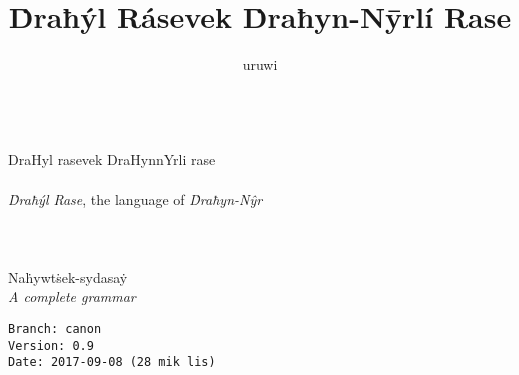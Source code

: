 \documentclass{book}
\title{Ḋraħýl Rásevek Ḋraħyn-Nȳrlí Rase}
\author{uruwi}
\begin{document}
\pagecolor{SkyBlue!25}

\begin{titlepage}
    \makeatletter
    \begin{center}
        {\color{Aquamarine} \hprule \vspace{1.5ex} \\}
        {\Huge \dhrfont \textcolor{Cerulean}{DraHyl rasevek DraHynnYrli rase}\\}
        {\large \sffamily \textcolor{RoyalBlue}{\@title} \\}
        {\large \textit{Ḋraħýl Rase}, the language of \textit{Ḋraħyn-Nŷr} \\}
        {\color{Aquamarine} \hprule \vspace{1.5ex} \\}
        \vspace{1.5cm}
        {\Large\bfseries \@author}\\[5pt]
        \vspace{2cm}
         \\
        {Naḣywtṡek-sydasaẏ} \\[5pt]
        \emph{A complete grammar}\\[2cm]
        \vfill
        \vfill
        {\@date}
    \end{center}
    \makeatother
\end{titlepage}

\pagecolor{SkyBlue!15}

\begin{verbatim}
Branch: canon
Version: 0.9
Date: 2017-09-08 (28 mik lis)
\end{verbatim}
\end{document}
